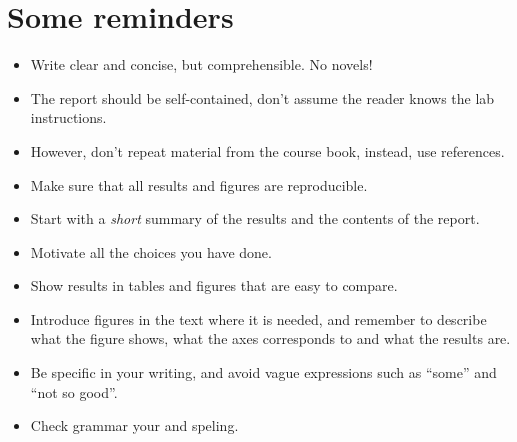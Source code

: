 \documentclass[a4paper]{article}
\begin{document}

\newpage
\section{Some reminders}
\begin{itemize}
	\item Write clear and concise, but comprehensible. No novels!
	\item The report should be self-contained, don't assume the reader knows the lab instructions.
	\item However, don't repeat material from the course book, instead, use references.
	\item Make sure that all results and figures are reproducible.
	\item Start with a \emph{short} summary of the results and the contents of the report.
	\item Motivate all the choices you have done.
	\item Show results in tables and figures that are easy to compare.
	\item Introduce figures in the text where it is needed, and remember to describe what the figure shows, what the axes corresponds to and what the results are.
	\item Be specific in your writing, and avoid vague expressions such as ``some'' and ``not so good''.
	\item Check grammar your and speling.
\end{itemize}
\end{document}
